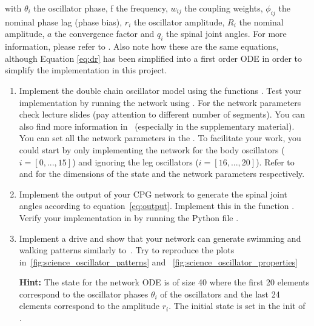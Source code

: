 \documentclass{cmc}
\begin{document}
with $ \theta_i $ the oscillator phase, f the frequency, $ w_{ij} $ the coupling
weights, $ \phi_{ij} $ the nominal phase lag (phase bias), $ r_i $ the
oscillator amplitude, $ R_i $ the nominal amplitude, $ a $ the convergence
factor and $ q_i $ the spinal joint angles. For more information, please refer
to \cite{ijspeert2007swimming}. Also note how these are the same equations,
although Equation \eqref{eq:dr} has been simplified into a first order ODE in
order to simplify the implementation in this project.

\begin{enumerate}
\item Implement the double chain oscillator model using the functions
  . Test your implementation by running the
  network using . For the network parameters check
  lecture slides (pay attention to different number of segments). You can also
  find more information in~\cite{ijspeert2007swimming} (especially in the
  supplementary material). You can set all the network parameters in the
  . To facilitate your work, you
  could start by only implementing the network for the body oscillators
  ($i=[0, ..., 15]$) and ignoring the leg oscillators ($i=[16, ..., 20]$). Refer
  to  and
  \- for the dimensions of
  the state and the network parameters respectively.

\item Implement the output of your CPG network to generate the spinal joint
  angles according to equation~\ref{eq:output}. Implement this in the function
  . Verify your implementation in by running
  the Python file .


\item Implement a drive and show that your network can generate swimming and
  walking patterns similarly to~\cite{ijspeert2007swimming}. Try to reproduce
  the plots in~\ref{fig:science_oscillator_patterns} and
~\ref{fig:science_oscillator_properties}


  \textbf{Hint:} The state for the network ODE is of size 40 where the first 20
  elements correspond to the oscillator phases $\theta_i$ of the oscillators and
  the last 24 elements correspond to the amplitude $r_i$. The initial state is
  set in the init of .
\end{enumerate}
\end{document}
